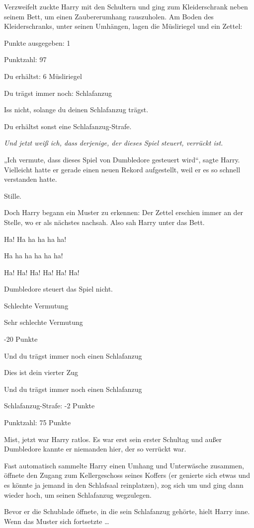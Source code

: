 {Verzweifelt zuckte Harry mit den Schultern und ging zum Kleiderschrank neben seinem Bett, um einen Zaubererumhang rauszuholen. Am Boden des Kleiderschranks, unter seinen Umhängen, lagen die Müsliriegel und ein Zettel:

Punkte ausgegeben: 1

Punktzahl: 97

Du erhältst: 6 Müsliriegel

Du trägst immer noch: Schlafanzug

Iss nicht, solange du deinen Schlafanzug trägst.

Du erhältst sonst eine Schlafanzug-Strafe.

\emph{Und jetzt weiß ich, dass derjenige, der dieses Spiel steuert, verrückt ist.}

„Ich vermute, dass dieses Spiel von Dumbledore gesteuert wird“, sagte Harry. Vielleicht hatte er gerade einen neuen Rekord aufgestellt, weil er es so schnell verstanden hatte.

Stille.

Doch Harry begann ein Muster zu erkennen: Der Zettel erschien immer an der Stelle, wo er als nächstes nachsah. Also sah Harry unter das Bett.

Ha! Ha ha ha ha ha!

Ha ha ha ha ha ha!

Ha! Ha! Ha! Ha! Ha! Ha!

Dumbledore steuert das Spiel nicht.

Schlechte Vermutung

Sehr schlechte Vermutung

-20 Punkte

Und du trägst immer noch einen Schlafanzug

Dies ist dein vierter Zug

Und du trägst immer noch einen Schlafanzug

Schlafanzug-Strafe: -2 Punkte

Punktzahl: 75 Punkte

Mist, jetzt war Harry ratlos. Es war erst sein erster Schultag und außer Dumbledore kannte er niemanden hier, der so verrückt war.

Fast automatisch sammelte Harry einen Umhang und Unterwäsche zusammen, öffnete den Zugang zum Kellergeschoss seines Koffers (er genierte sich etwas und es könnte ja jemand in den Schlafsaal reinplatzen), zog sich um und ging dann wieder hoch, um seinen Schlafanzug wegzulegen.

Bevor er die Schublade öffnete, in die sein Schlafanzug gehörte, hielt Harry inne. Wenn das Muster sich fortsetzte …

}

